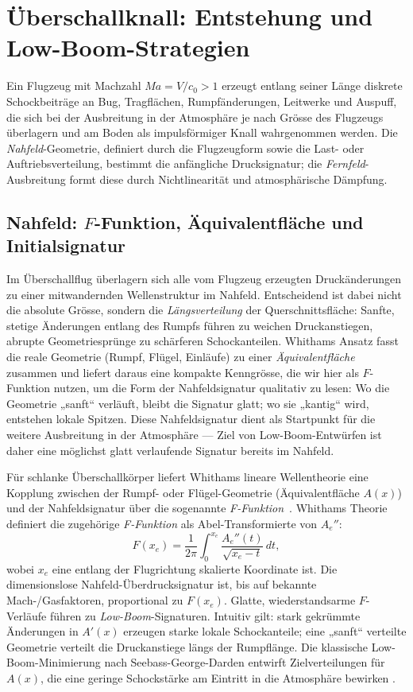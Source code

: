 \section{Überschallknall: Entstehung und Low-Boom-Strategien}
\label{schall:section:boom}

Ein Flugzeug mit Machzahl $\textit{Ma}=V/c_0>1$ erzeugt entlang seiner Länge diskrete
Schockbeiträge an Bug, Tragflächen, Rumpfänderungen, Leitwerke und Auspuff,
die sich bei der Ausbreitung in der Atmosphäre je nach Grösse des Flugzeugs
überlagern und am Boden als impulsförmiger Knall wahrgenommen werden.
Die \emph{Nahfeld}-Geometrie, definiert durch die Flugzeugform sowie die  Last- oder
Auftriebsverteilung, bestimmt die anfängliche Drucksignatur;
die \emph{Fernfeld}-Ausbreitung formt diese durch Nichtlinearität und atmosphärische Dämpfung.

\subsection{Nahfeld: $F$-Funktion, Äquivalentfläche und Initialsignatur}
Im Überschallflug überlagern sich alle vom Flugzeug erzeugten Druckänderungen zu
einer mitwandernden Wellenstruktur im Nahfeld.
Entscheidend ist dabei nicht die absolute Grösse, sondern die \emph{Längsverteilung} der Querschnittsfläche: Sanfte, stetige Änderungen entlang des Rumpfs führen zu weichen
Druckanstiegen, abrupte Geometriesprünge zu schärferen Schockanteilen.
Whithams Ansatz fasst die reale Geometrie (Rumpf, Flügel, Einläufe) zu einer \emph{Äquivalentfläche} zusammen und liefert daraus eine kompakte Kenngrösse, die wir hier als \(F\)-Funktion nutzen, um
die Form der Nahfeldsignatur qualitativ zu lesen: Wo die Geometrie „sanft“ verläuft, bleibt die
Signatur glatt; wo sie „kantig“ wird, entstehen lokale Spitzen.
Diese Nahfeldsignatur dient als Startpunkt für die weitere Ausbreitung
in der Atmosphäre — Ziel von Low-Boom-Entwürfen ist daher eine möglichst glatt
verlaufende Signatur bereits im Nahfeld.

Für schlanke Überschallkörper liefert Whithams lineare Wellentheorie eine Kopplung
zwischen der Rumpf- oder Flügel-Geometrie (Äquivalentfläche $A(x)$) und der
Nahfeldsignatur über die sogenannte \emph{F-Funktion}~\cite{schall:whitham}.
Whithams Theorie definiert die zugehörige \emph{F-Funktion}
als Abel-Transformierte von $A_e''$:
\begin{equation}
    F(x_e)=\frac{1}{2\pi}\int_{0}^{x_e}\frac{A_e''(t)}{\sqrt{x_e-t}}\,dt,
\end{equation}
wobei $x_e$ eine entlang der Flugrichtung skalierte Koordinate ist.
Die dimensionslose Nahfeld-Überdrucksignatur ist, bis auf bekannte
Mach-/Gasfaktoren, proportional zu $F(x_e)$.
Glatte, wiederstandsarme $F$-Verläufe führen zu \emph{Low-Boom}-Signaturen.
Intuitiv gilt: stark gekrümmte Änderungen in $A'(x)$ erzeugen starke lokale
Schockanteile; eine „sanft“ verteilte Geometrie verteilt die Druckanstiege
längs der Rumpflänge.
Die klassische Low-Boom-Minimierung nach Seebass-George-Darden entwirft
Zielverteilungen für $A(x)$, die eine geringe Schockstärke am Eintritt in
die Atmosphäre bewirken \cite{schall:whitham,schall:seebassgeorge,schall:darden75}.


